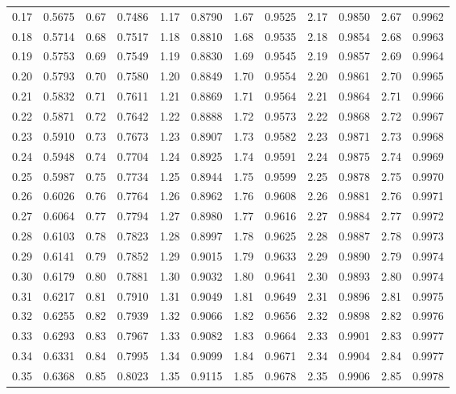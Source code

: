 \documentclass[12pt,letterpaper]{article}
\begin{document}
\begin{center}
\begin{tabular}{c c | c c | c c | c c | c c | c c}
0.17 & 0.5675 & 0.67 & 0.7486 & 1.17 & 0.8790 & 1.67 & 0.9525 & 2.17 & 0.9850 & 2.67 & 0.9962 \\
0.18 & 0.5714 & 0.68 & 0.7517 & 1.18 & 0.8810 & 1.68 & 0.9535 & 2.18 & 0.9854 & 2.68 & 0.9963 \\
0.19 & 0.5753 & 0.69 & 0.7549 & 1.19 & 0.8830 & 1.69 & 0.9545 & 2.19 & 0.9857 & 2.69 & 0.9964 \\
0.20 & 0.5793 & 0.70 & 0.7580 & 1.20 & 0.8849 & 1.70 & 0.9554 & 2.20 & 0.9861 & 2.70 & 0.9965 \\
0.21 & 0.5832 & 0.71 & 0.7611 & 1.21 & 0.8869 & 1.71 & 0.9564 & 2.21 & 0.9864 & 2.71 & 0.9966 \\
0.22 & 0.5871 & 0.72 & 0.7642 & 1.22 & 0.8888 & 1.72 & 0.9573 & 2.22 & 0.9868 & 2.72 & 0.9967 \\
0.23 & 0.5910 & 0.73 & 0.7673 & 1.23 & 0.8907 & 1.73 & 0.9582 & 2.23 & 0.9871 & 2.73 & 0.9968 \\
0.24 & 0.5948 & 0.74 & 0.7704 & 1.24 & 0.8925 & 1.74 & 0.9591 & 2.24 & 0.9875 & 2.74 & 0.9969 \\
0.25 & 0.5987 & 0.75 & 0.7734 & 1.25 & 0.8944 & 1.75 & 0.9599 & 2.25 & 0.9878 & 2.75 & 0.9970 \\
0.26 & 0.6026 & 0.76 & 0.7764 & 1.26 & 0.8962 & 1.76 & 0.9608 & 2.26 & 0.9881 & 2.76 & 0.9971 \\
0.27 & 0.6064 & 0.77 & 0.7794 & 1.27 & 0.8980 & 1.77 & 0.9616 & 2.27 & 0.9884 & 2.77 & 0.9972 \\
0.28 & 0.6103 & 0.78 & 0.7823 & 1.28 & 0.8997 & 1.78 & 0.9625 & 2.28 & 0.9887 & 2.78 & 0.9973 \\
0.29 & 0.6141 & 0.79 & 0.7852 & 1.29 & 0.9015 & 1.79 & 0.9633 & 2.29 & 0.9890 & 2.79 & 0.9974 \\
0.30 & 0.6179 & 0.80 & 0.7881 & 1.30 & 0.9032 & 1.80 & 0.9641 & 2.30 & 0.9893 & 2.80 & 0.9974 \\
0.31 & 0.6217 & 0.81 & 0.7910 & 1.31 & 0.9049 & 1.81 & 0.9649 & 2.31 & 0.9896 & 2.81 & 0.9975 \\
0.32 & 0.6255 & 0.82 & 0.7939 & 1.32 & 0.9066 & 1.82 & 0.9656 & 2.32 & 0.9898 & 2.82 & 0.9976 \\
0.33 & 0.6293 & 0.83 & 0.7967 & 1.33 & 0.9082 & 1.83 & 0.9664 & 2.33 & 0.9901 & 2.83 & 0.9977 \\
0.34 & 0.6331 & 0.84 & 0.7995 & 1.34 & 0.9099 & 1.84 & 0.9671 & 2.34 & 0.9904 & 2.84 & 0.9977 \\
0.35 & 0.6368 & 0.85 & 0.8023 & 1.35 & 0.9115 & 1.85 & 0.9678 & 2.35 & 0.9906 & 2.85 & 0.9978 \\

\end{tabular}
\end{center}
\end{document}

